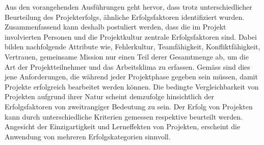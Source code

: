 \newline\newline Aus den vorangehenden Ausführungen geht hervor, dass trotz unterschiedlicher Beurteilung des Projekterfolgs, ähnliche Erfolgsfaktoren identifiziert wurden. Zusammenfassend kann deshalb postuliert werden, dass die im Projekt involvierten Personen und die Projektkultur zentrale Erfolgsfaktoren sind. Dabei bilden nachfolgende Attribute wie, Fehlerkultur, Teamfähigkeit, Konfliktfähigkeit, Vertrauen, gemeinsame Mission nur einen Teil derer Gesamtmenge ab, um die Art der Projektteilnehmer und das Arbeitsklima zu erfassen. Gemäss \citealp{alamg16} sind dies jene Anforderungen, die während jeder Projektphase gegeben sein müssen, damit Projekte erfolgreich bearbeitet werden können. Die bedingte Vergleichbarkeit von Projekten aufgrund ihrer Natur scheint demzufolge hinsichtlich der Erfolgsfaktoren von zweitrangiger Bedeutung zu sein. Der Erfolg von Projekten kann durch unterschiedliche Kriterien gemessen respektive beurteilt werden. Angesicht der Einzigartigkeit und Lerneffekten von Projekten, erscheint die Anwendung von mehreren Erfolgskategorien sinnvoll. 
